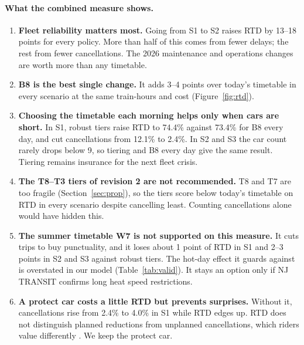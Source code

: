 \documentclass[11pt]{article}
\begin{document}
\paragraph{What the combined measure shows.}
\begin{enumerate}
\item \textbf{Fleet reliability matters most.} Going from S1 to S2 raises RTD by 13--18 points for every policy. More than half of this comes from fewer delays; the rest from fewer cancellations. The 2026 maintenance and operations changes are worth more than any timetable.
\item \textbf{B8 is the best single change.} It adds 3--4 points over today's timetable in every scenario at the same train-hours and cost (Figure~\ref{fig:rtd}).
\item \textbf{Choosing the timetable each morning helps only when cars are short.} In S1, robust tiers raise RTD to 74.4\% against 73.4\% for B8 every day, and cut cancellations from 12.1\% to 2.4\%. In S2 and S3 the car count rarely drops below 9, so tiering and B8 every day give the same result. Tiering remains insurance for the next fleet crisis.
\item \textbf{The T8--T3 tiers of revision 2 are not recommended.} T8 and T7 are too fragile (Section~\ref{sec:prop}), so the tiers score below today's timetable on RTD in every scenario despite cancelling least. Counting cancellations alone would have hidden this.
\item \textbf{The summer timetable W7 is not supported on this measure.} It cuts trips to buy punctuality, and it loses about 1 point of RTD in S1 and 2--3 points in S2 and S3 against robust tiers. The hot-day effect it guards against is overstated in our model (Table~\ref{tab:valid}). It stays an option only if NJ TRANSIT confirms long heat speed restrictions.
\item \textbf{A protect car costs a little RTD but prevents surprises.} Without it, cancellations rise from 2.4\% to 4.0\% in S1 while RTD edges up. RTD does not distinguish planned reductions from unplanned cancellations, which riders value differently \citep{usdot2016vtts}. We keep the protect car.
\end{enumerate}
\end{document}
